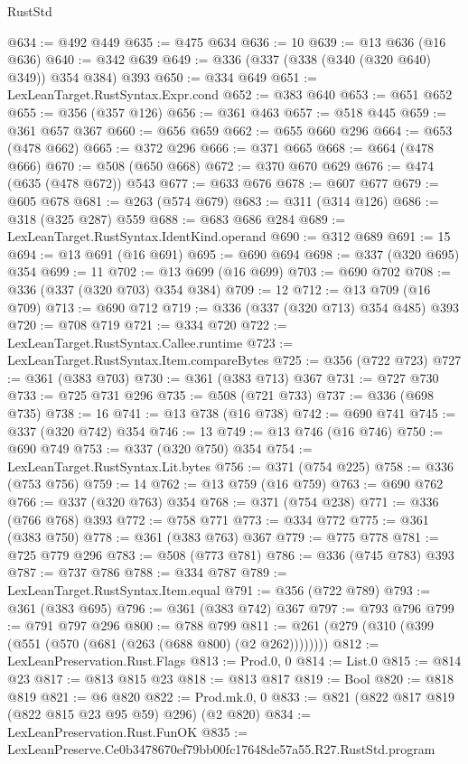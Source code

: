\begin{lexlean}{RustStd}
\begin{coremodule}
@634 := @492 @449
@635 := @475 @634
@636 := 10
@639 := @13 @636 (@16 @636)
@640 := @342 @639
@649 := @336 (@337 (@338 (@340 (@320 @640) @349)) @354 @384) @393
@650 := @334 @649
@651 := LexLeanTarget.RustSyntax.Expr.cond
@652 := @383 @640
@653 := @651 @652
@655 := @356 (@357 @126)
@656 := @361 @463
@657 := @518 @445
@659 := @361 @657 @367
@660 := @656 @659
@662 := @655 @660 @296
@664 := @653 (@478 @662)
@665 := @372 @296
@666 := @371 @665
@668 := @664 (@478 @666)
@670 := @508 (@650 @668)
@672 := @370 @670 @629
@676 := @474 (@635 (@478 @672)) @543
@677 := @633 @676
@678 := @607 @677
@679 := @605 @678
@681 := @263 (@574 @679)
@683 := @311 (@314 @126)
@686 := @318 (@325 @287) @559
@688 := @683 @686 @284
@689 := LexLeanTarget.RustSyntax.IdentKind.operand
@690 := @312 @689
@691 := 15
@694 := @13 @691 (@16 @691)
@695 := @690 @694
@698 := @337 (@320 @695) @354
@699 := 11
@702 := @13 @699 (@16 @699)
@703 := @690 @702
@708 := @336 (@337 (@320 @703) @354 @384)
@709 := 12
@712 := @13 @709 (@16 @709)
@713 := @690 @712
@719 := @336 (@337 (@320 @713) @354 @485) @393
@720 := @708 @719
@721 := @334 @720
@722 := LexLeanTarget.RustSyntax.Callee.runtime
@723 := LexLeanTarget.RustSyntax.Item.compareBytes
@725 := @356 (@722 @723)
@727 := @361 (@383 @703)
@730 := @361 (@383 @713) @367
@731 := @727 @730
@733 := @725 @731 @296
@735 := @508 (@721 @733)
@737 := @336 (@698 @735)
@738 := 16
@741 := @13 @738 (@16 @738)
@742 := @690 @741
@745 := @337 (@320 @742) @354
@746 := 13
@749 := @13 @746 (@16 @746)
@750 := @690 @749
@753 := @337 (@320 @750) @354
@754 := LexLeanTarget.RustSyntax.Lit.bytes
@756 := @371 (@754 @225)
@758 := @336 (@753 @756)
@759 := 14
@762 := @13 @759 (@16 @759)
@763 := @690 @762
@766 := @337 (@320 @763) @354
@768 := @371 (@754 @238)
@771 := @336 (@766 @768) @393
@772 := @758 @771
@773 := @334 @772
@775 := @361 (@383 @750)
@778 := @361 (@383 @763) @367
@779 := @775 @778
@781 := @725 @779 @296
@783 := @508 (@773 @781)
@786 := @336 (@745 @783) @393
@787 := @737 @786
@788 := @334 @787
@789 := LexLeanTarget.RustSyntax.Item.equal
@791 := @356 (@722 @789)
@793 := @361 (@383 @695)
@796 := @361 (@383 @742) @367
@797 := @793 @796
@799 := @791 @797 @296
@800 := @788 @799
@811 := @261 (@279 (@310 (@399 (@551 (@570 (@681 (@263 (@688 @800) (@2 @262))))))))
@812 := LexLeanPreservation.Rust.Flags
@813 := Prod.{0, 0}
@814 := List.{0}
@815 := @814 @23
@817 := @813 @815 @23
@818 := @813 @817
@819 := Bool
@820 := @818 @819
@821 := @6 @820
@822 := Prod.mk.{0, 0}
@833 := @821 (@822 @817 @819 (@822 @815 @23 @95 @59) @296) (@2 @820)
@834 := LexLeanPreservation.Rust.FunOK
@835 := LexLeanPreserve.Ce0b3478670ef79bb00fc17648de57a55.R27.RustStd.program

\end{coremodule}
\end{lexlean}
